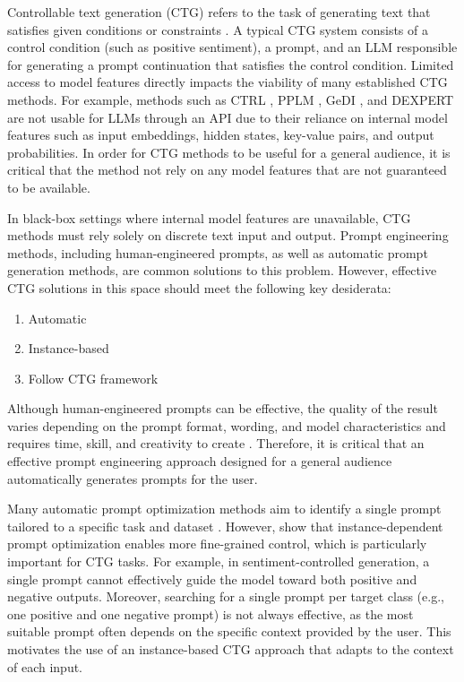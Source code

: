 \documentclass[phd,electronic,oneside,twosidetoc,letterpaper,chaptercenter,parttop,lof]{byumsphd}
\begin{document}
Controllable text generation (CTG) refers to the task of generating text that satisfies given conditions or constraints \citep{zhang2023survey}. 
A typical CTG system consists of a control condition (such as positive sentiment), a prompt, and an LLM responsible for generating a prompt continuation that satisfies the control condition.
Limited access to model features directly impacts the viability of many established CTG methods.
For example, methods such as CTRL \citep{keskar2019ctrl}, PPLM \citep{dathathri2020plug}, GeDI \citep{krause2021gedi}, and DEXPERT \citep{liu2021dexpert} are not usable for LLMs through an API due to their reliance on internal model features such as input embeddings, hidden states, key-value pairs, and output probabilities.
In order for CTG methods to be useful for a general audience, it is critical that the method not rely on any model features that are not guaranteed to be available.

In black-box settings where internal model features are unavailable, CTG methods must rely solely on discrete text input and output.
Prompt engineering methods, including human-engineered prompts, as well as automatic prompt generation methods, are common solutions to this problem.
However, effective CTG solutions in this space should meet the following key desiderata:

\begin{enumerate}
    \item Automatic
    \item Instance-based 
    \item Follow CTG framework
\end{enumerate}

Although human-engineered prompts can be effective, the quality of the result varies depending on the prompt format, wording, and model characteristics \citep{meincke2025prompting} and requires time, skill, and creativity to create \citep{lazovsky2025prompt}.
Therefore, it is critical that an effective prompt engineering approach designed for a general audience automatically generates prompts for the user.

Many automatic prompt optimization methods aim to identify a single prompt tailored to a specific task and dataset \citep{shin2020autoprompt, yang2024opro}.
However, \citet{wu2022idpg} show that instance-dependent prompt optimization enables more fine-grained control, which is particularly important for CTG tasks.
For example, in sentiment-controlled generation, a single prompt cannot effectively guide the model toward both positive and negative outputs.
Moreover, searching for a single prompt per target class (e.g., one positive and one negative prompt) is not always effective, as the most suitable prompt often depends on the specific context provided by the user.
This motivates the use of an instance-based CTG approach that adapts to the context of each input.
\end{document}

